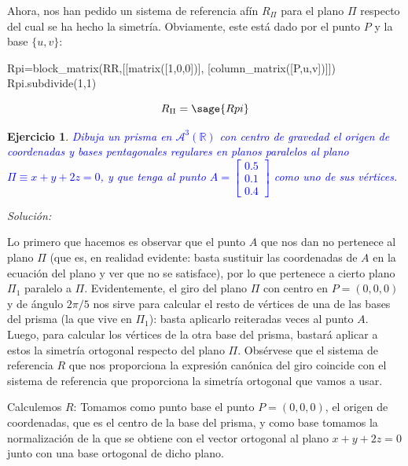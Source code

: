 \documentclass{amsart}
\newtheorem{ejer}{Ejercicio}
\begin{document}
Ahora, nos han pedido un sistema de referencia afín $R_{\Pi}$ para el plano $\Pi$ respecto del cual se ha hecho la simetría. Obviamente, este está dado por el punto $P$ y la base $\{u,v\}$:

\begin{sageblock}
Rpi=block_matrix(RR,[[matrix([1,0,0])],
                  [column_matrix([P,u,v])]])
Rpi.subdivide(1,1)
\end{sageblock}
$$R_{\Pi}=\sage{Rpi}$$


\newpage


\begin{ejer}\label{ej:prisma}
\textcolor{blue}{Dibuja un prisma en $\mathcal{A}^3(\mathbb{R})$ con centro de gravedad el origen de coordenadas y bases pentagonales regulares en planos paralelos al plano $\Pi \equiv x+y+2z=0$, y que tenga al punto $A=\left[\begin{array}{c}0.5\\0.1\\0.4\end{array}\right]$ como uno de sus v\'ertices.} 
\end{ejer}

{\it Solución:}


Lo primero que hacemos es observar que el punto $A$ que nos dan no pertenece al plano $\Pi$ (que es, en realidad evidente: basta sustituir las coordenadas de $A$ en la ecuación del plano y ver que no se satisface), por lo que pertenece a cierto plano $\Pi_1$ paralelo a $\Pi$. Evidentemente, el giro del plano $\Pi$ con centro en $P=(0,0,0)$ y de ángulo $2\pi/5$ nos sirve para calcular el resto de vértices de una de las bases del prisma (la que vive en $\Pi_1$): basta aplicarlo reiteradas veces al punto $A$. Luego, para calcular los vértices de la otra base del prisma, bastará aplicar a estos la simetría ortogonal respecto del plano $\Pi$.   Obsérvese que el sistema de referencia $R$ que nos proporciona la expresión canónica del giro coincide con el sistema de referencia que proporciona la simetría ortogonal que vamos a usar.

  

Calculemos $R$: Tomamos como punto base el punto $P=(0,0,0)$, el origen de coordenadas, que es el centro de la base del prisma, y como base tomamos la normalización de la que se obtiene con el vector ortogonal al plano $x+y+2z = 0$ junto con una base ortogonal de dicho plano.
\end{document}
